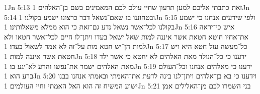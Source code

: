 1Jn 5:13  זאת כתבתי אליכם למען תדעון שחיי עולם לכם המאמינים בשם בן־האלהים׃
1Jn 5:14  ובטחוננו בו שאם־נשאל דבר כרצונו ישמע בקולנו׃
1Jn 5:15  ולפי שידעים אנחנו כי ישמע בקולנו לכל־אשר נשאל נדע גם־זאת כי הוא ממלא משאלותינו׃
1Jn 5:16  איש כי־יראה את־אחיו חוטא חטאת אשר איננה למות שאל ישאל בעדו ויתן־לו חיים לכל־אשר חטאו ולא למות הן־יש חטא מות על־זה לא אמר לשאול בעדו׃
1Jn 5:17  כל־מעשה עול חטא היא ויש חטאת אשר איננה למות׃
1Jn 5:18  ידענו כי כל־הנולד מאת האלהים לא יחטא כי אשר ילד מאת האלהים ישמר את־נפשו והרע לא־יגע בו׃
1Jn 5:19  ידענו כי מאלהים אנחנו וכל־העולם ברע הוא׃
1Jn 5:20  וידענו כי בא בן־אלהים ויתן־לנו בינה לדעת את־האמתי ובאמתי אנחנו בבנו ישוע המשיח זה הוא האל האמתי וחיי העולמים׃
1Jn 5:21  בני השמרו לכם מן־האלילים אמן׃


